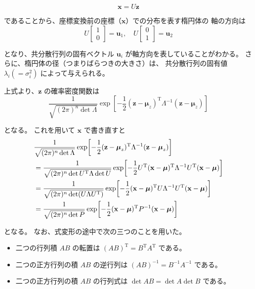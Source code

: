 \documentclass[10pt,a4paper,titlepage]{jreport} %
\begin{document}
\begin{equation}
\mathbf{x} = U\mathbf{z}
\end{equation}

であることから、座標変換前の座標（$\mathbf{x}$）での分布を表す楕円体の
軸の方向は
\begin{equation}
U
\begin{bmatrix}
1 \\ 0
\end{bmatrix}
= \mathbf{u}_1,
\quad
U
\begin{bmatrix}
0 \\ 1
\end{bmatrix}
= \mathbf{u}_2
\end{equation}

となり、共分散行列の固有ベクトル $\mathbf{u}_i$ が軸方向を表していることがわかる。
さらに、楕円体の径（つまりばらつきの大きさ）は、
共分散行列の固有値 $\lambda_i(=\sigma_i^2)$ によって与えられる。

上式より、$\mathbf{z}$ の確率密度関数は
\begin{equation}
\frac{1}{\sqrt{(2\pi)^n \det \Lambda}}
\exp\!\left[
-\frac{1}{2}(\mathbf{z}-\boldsymbol{\mu}_z)^{\mathrm{T}}
\Lambda^{-1}(\mathbf{z}-\boldsymbol{\mu}_z)
\right]
\end{equation}

となる。
これを用いて $\mathbf{x}$ で書き直すと
\begin{align}
&\frac{1}{\sqrt{(2\pi)^n \det \Lambda}}
\exp\!\left[
-\frac{1}{2}(\mathbf{z}-\boldsymbol{\mu}_z)^{\mathrm{T}}
\Lambda^{-1}(\mathbf{z}-\boldsymbol{\mu}_z)
\right] \notag \\
&= \frac{1}{\sqrt{(2\pi)^n \det U^{\mathrm{T}}\Lambda \det U}}
\exp\!\left[
-\frac{1}{2}U^{\mathrm{T}}(\mathbf{x}-\boldsymbol{\mu})^{\mathrm{T}}
\Lambda^{-1}U^{\mathrm{T}}(\mathbf{x}-\boldsymbol{\mu})
\right] \notag \\
&= \frac{1}{\sqrt{(2\pi)^n \det (U\Lambda U^{\mathrm{T}})}}
\exp\!\left[
-\frac{1}{2}(\mathbf{x}-\boldsymbol{\mu})^{\mathrm{T}}
U\Lambda^{-1}U^{\mathrm{T}}(\mathbf{x}-\boldsymbol{\mu})
\right] \notag \\
&= \frac{1}{\sqrt{(2\pi)^n \det P}}
\exp\!\left[
-\frac{1}{2}(\mathbf{x}-\boldsymbol{\mu})^{\mathrm{T}}
P^{-1}(\mathbf{x}-\boldsymbol{\mu})
\right]
\end{align}

となる。
なお、式変形の途中で次の三つのことを用いた。
\begin{itemize}
\item[(i)] 二つの行列積 $AB$ の転置は $(AB)^{\mathrm{T}} = B^{\mathrm{T}}A^{\mathrm{T}}$ である。
\item[(ii)] 二つの正方行列の積 $AB$ の逆行列は $(AB)^{-1} = B^{-1}A^{-1}$ である。
\item[(iii)] 二つの正方行列の積 $AB$ の行列式は $\det AB = \det A \det B$ である。
\end{itemize}
\end{document}
